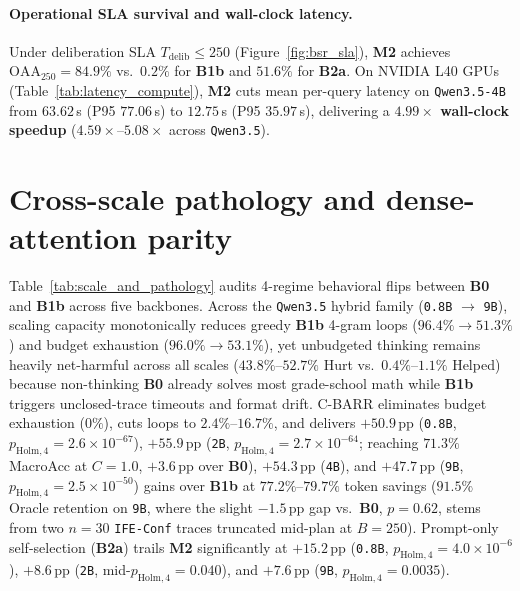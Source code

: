 \documentclass{article}
\begin{document}
\paragraph{Operational SLA survival and wall-clock latency.}
Under deliberation SLA $T_{\text{delib}} \le 250$ (Figure~\ref{fig:bsr_sla}), \textbf{M2} achieves $\text{OAA}_{250} = 84.9\%$ vs.\ $0.2\%$ for \textbf{B1b} and $51.6\%$ for \textbf{B2a}. On NVIDIA L40 GPUs (Table~\ref{tab:latency_compute}), \textbf{M2} cuts mean per-query latency on \texttt{Qwen3.5-4B} from $63.62$\,s (P95 $77.06$\,s) to $12.75$\,s (P95 $35.97$\,s), delivering a \textbf{$4.99\times$ wall-clock speedup} ($4.59\times$--$5.08\times$ across \texttt{Qwen3.5}).



\section{Cross-scale pathology and dense-attention parity}
\label{sec:scale}

Table~\ref{tab:scale_and_pathology} audits 4-regime behavioral flips between \textbf{B0} and \textbf{B1b} across five backbones. Across the \texttt{Qwen3.5} hybrid family (\texttt{0.8B} $\to$ \texttt{9B}), scaling capacity monotonically reduces greedy \textbf{B1b} 4-gram loops ($96.4\% \to 51.3\%$) and budget exhaustion ($96.0\% \to 53.1\%$), yet unbudgeted thinking remains heavily net-harmful across all scales ($43.8\%$--$52.7\%$ Hurt vs.\ $0.4\%$--$1.1\%$ Helped) because non-thinking \textbf{B0} already solves most grade-school math while \textbf{B1b} triggers unclosed-trace timeouts and format drift. C-BARR eliminates budget exhaustion ($0\%$), cuts loops to $2.4\%$--$16.7\%$, and delivers $+50.9$\,pp (\texttt{0.8B}, $p_{\text{Holm},4}=2.6 \times 10^{-67}$), $+55.9$\,pp (\texttt{2B}, $p_{\text{Holm},4}=2.7 \times 10^{-64}$; reaching $71.3\%$ MacroAcc at $C=1.0$, $+3.6$\,pp over \textbf{B0}), $+54.3$\,pp (\texttt{4B}), and $+47.7$\,pp (\texttt{9B}, $p_{\text{Holm},4}=2.5 \times 10^{-50}$) gains over \textbf{B1b} at $77.2\%$--$79.7\%$ token savings ($91.5\%$ Oracle retention on \texttt{9B}, where the slight $-1.5$\,pp gap vs.\ \textbf{B0}, $p=0.62$, stems from two $n=30$ \texttt{IFE-Conf} traces truncated mid-plan at $B=250$). Prompt-only self-selection (\textbf{B2a}) trails \textbf{M2} significantly at $+15.2$\,pp (\texttt{0.8B}, $p_{\text{Holm},4}=4.0 \times 10^{-6}$), $+8.6$\,pp (\texttt{2B}, mid-$p_{\text{Holm},4}=0.040$), and $+7.6$\,pp (\texttt{9B}, $p_{\text{Holm},4}=0.0035$).
\end{document}
